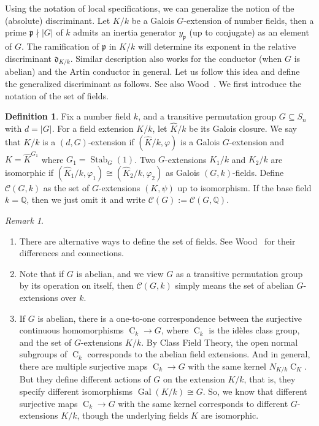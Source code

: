 \documentclass[12pt,a4paper]{amsart}
\numberwithin{equation}{section}%
\theoremstyle{plain}%
\theoremstyle{definition}%
\newtheorem{definition}[theorem]{Definition}%
\theoremstyle{remark}%
\newtheorem*{remark}{Remark}%
\begin{document}
	Using the notation of local specifications, we can generalize the notion of the (absolute) discriminant.
	Let $K/k$ be a Galois $G$-extension of number fields, then a prime $\mathfrak{p}\nmid\lvert G\rvert$ of $k$ admits an inertia generator $y_{\mathfrak{p}}$ (up to conjugate) as an element of $G$.
	The ramification of $\mathfrak{p}$ in $K/k$ will determine its exponent in the relative discriminant $\mathfrak{d}_{K/k}$.
	Similar description also works for the conductor (when $G$ is abelian) and the Artin conductor in general.
	Let us follow this idea and define the generalized discriminant as follows.
	See also Wood~\cite[Section 2]{wood2010probabilities}.	
	We first introduce the notation of the set of fields.
	\begin{definition}\label{def:set of fields}
		Fix a number field $k$, and a transitive permutation group $G\subseteq S_n$ with $d=\lvert G\rvert$.
		For a field extension $K/k$, let $\hat{K}/k$ be its Galois closure.
		We say that $K/k$ is a $(d,G)$-extension if $(\hat{K}/k,\varphi)$ is a Galois $G$-extension and $K=\hat{K}^{G_1}$ where $G_1=\operatorname{Stab}_G(1)$.
		Two $G$-extensions $K_1/k$ and $K_2/k$ are isomorphic if $(\hat{K}_1/k,\varphi_1)\cong(\hat{K}_2/k,\varphi_2)$ as Galois $(G,k)$-fields.
		Define ${\mathcal{C}}(G,k)$ as the set of $G$-extensions $(K,\psi)$ up to isomorphism.
		If the base field $k=\mathbb{Q}$, then we just omit it and write ${\mathcal{C}}(G):={\mathcal{C}}(G,\mathbb{Q})$.
	\end{definition}
	\begin{remark}
		\begin{enumerate}
			\item There are alternative ways to define the set of fields.
			See Wood~\cite[p.292]{directions2016} for their differences and connections.
			\item Note that if $G$ is abelian, and we view $G$ as a transitive permutation group by its operation on itself, then $\mathcal{C}(G,k)$ simply means the set of abelian $G$-extensions over $k$.
			\item If $G$ is abelian, there is a one-to-one correspondence between the surjective continuous homomorphisms $\operatorname{C}_k\to G$, where $\operatorname{C}_k$ is the id{\`e}les class group, and the set of $G$-extensions $K/k$.
			By Class Field Theory, the open normal subgroups of $\operatorname{C}_k$ corresponds to the abelian field extensions.
			And in general, there are multiple surjective maps $\operatorname{C}_k\to G$ with the same kernel $N_{K/k}\operatorname{C}_K$.			
			But they define different actions of $G$ on the extension $K/k$, that is, they specify different isomorphisms $\operatorname{Gal}(K/k)\cong G$.
			So, we know that different surjective maps $\operatorname{C}_k\to G$ with the same kernel corresponds to different $G$-extensions $K/k$, though the underlying fields $K$ are isomorphic.
		\end{enumerate}
	\end{remark}
\end{document}
